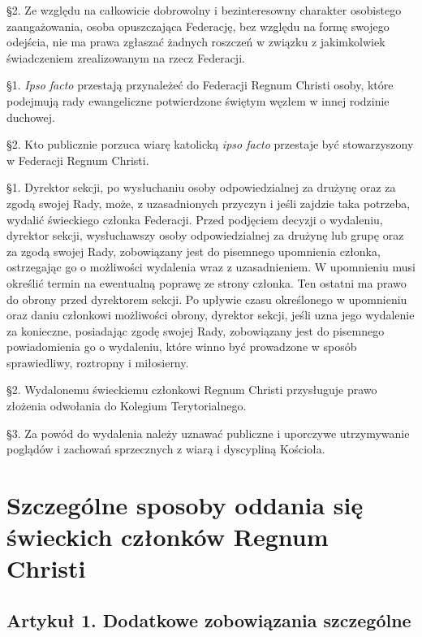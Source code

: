 \S{}2. Ze względu na całkowicie dobrowolny i bezinteresowny charakter osobistego zaangażowania, osoba opuszczająca Federację, bez względu na formę swojego odejścia, nie ma prawa zgłaszać żadnych roszczeń w związku z jakimkolwiek świadczeniem zrealizowanym na rzecz Federacji.


 \S{}1. {\em Ipso facto} przestają przynależeć do Federacji Regnum Christi osoby, które podejmują rady ewangeliczne potwierdzone świętym węzłem w innej rodzinie duchowej.

\S{}2. Kto publicznie porzuca wiarę katolicką {\em ipso facto} przestaje być stowarzyszony w Federacji Regnum Christi.


 \S{}1. Dyrektor sekcji, po wysłuchaniu osoby odpowiedzialnej za drużynę oraz za zgodą swojej Rady, może, z uzasadnionych przyczyn i jeśli zajdzie taka potrzeba, wydalić świeckiego członka Federacji. Przed podjęciem decyzji o wydaleniu, dyrektor sekcji, wysłuchawszy osoby odpowiedzialnej za drużynę lub grupę oraz za zgodą swojej Rady, zobowiązany jest do pisemnego upomnienia członka, ostrzegając go o możliwości wydalenia wraz z uzasadnieniem. W upomnieniu musi określić termin na ewentualną poprawę ze strony członka. Ten ostatni ma prawo do obrony przed dyrektorem sekcji. Po upływie czasu określonego w upomnieniu oraz daniu członkowi możliwości obrony, dyrektor sekcji, jeśli uzna jego wydalenie za konieczne, posiadając zgodę swojej Rady, zobowiązany jest do pisemnego powiadomienia go o wydaleniu, które winno być prowadzone w sposób sprawiedliwy, roztropny i miłosierny.

\S{}2. Wydalonemu świeckiemu członkowi Regnum Christi przysługuje prawo złożenia odwołania do Kolegium Terytorialnego.

\S{}3. Za powód do wydalenia należy uznawać publiczne i uporczywe utrzymywanie poglądów i zachowań sprzecznych z wiarą i dyscypliną Kościoła.

\chapter{Szczególne sposoby oddania się świeckich członków Regnum Christi}


\section{Artykuł 1. Dodatkowe zobowiązania szczególne}

